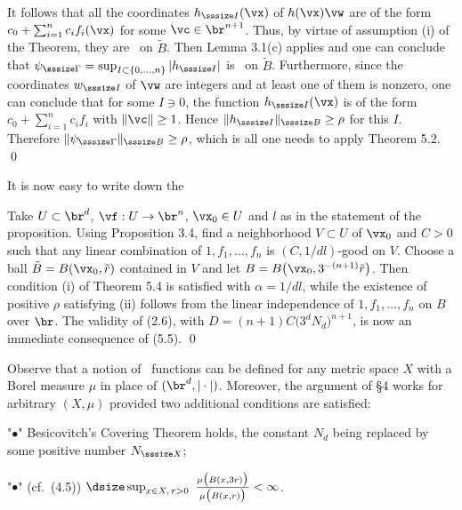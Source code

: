 It follows that all the coordinates $h_{\sssize I}(\vx)$ of $h(\vx)\vw$ are of the form $c_0 + \sum_{i = 1}^nc_if_i(\vx)$ for some $\vc \in \br^{n+1}$. Thus, by virtue of assumption (i) of the Theorem, they are  \cag\ on $\tilde B$. Then Lemma 3.1(c) applies and one can conclude that $\psi_{\sssize \Gamma} = \sup_{I\subset \{0,\dots,n\}}|h_{\sssize I}|$ is \cag\ on $\tilde B$. Furthermore, since the coordinates $w_{\sssize I}$ of $\vw$ are integers and at least one of them is nonzero, one can conclude that for some $I\ni 0$, the function   $h_{\sssize I}(\vx)$ is of the form $c_0 + \sum_{i = 1}^nc_if_i$ with  $\|\vc\| \ge 1$. Hence $\|h_{\sssize I}\|_{\sssize B} \ge \rho$ for this $I$. Therefore $\|\psi_{\sssize \Gamma} \|_{\sssize B} \ge \rho$, which is all one needs to apply Theorem 5.2. 
\qed\enddemo


It is now easy to write down the 


 Take $U\subset \br^d$, $\vf:U\to\br^n$, $\vx_0\in U$ and $l$ as in the statement of the proposition. Using Proposition 3.4, 
find a neighborhood $V\subset U$ of $\vx_0$ and $C> 0$  such that any linear combination of $1,f_1,\dots,f_n$ is $(C,1/dl)$-good on $V$. Choose a ball $\tilde B = B(\vx_0,\tilde r)$ contained in $V$ and let $B = B\big(\vx_0,3^{-(n+1)}\tilde r\big)$. Then  
condition (i) of Theorem 5.4 is satisfied with $\alpha = 1/dl$, while
the existence of positive $\rho$ satisfying (ii) follows from the linear independence of $1,f_1,\dots,f_n$ on $B$ over $\br$. The validity of (2.6), with $D = ({n+1})C\big(3^dN_d\big)^{n+1}$, is now an immediate consequence of (5.5).
\qed\enddemo

\endheading 


\endsubhead 
Observe that a notion of \cag\ functions can be defined for any metric space $X$ with a Borel measure $\mu$ in place of $(\br^d,|\cdot|)$. Moreover, the argument of \S 4 works for arbitrary $(X,\mu)$ provided two additional conditions are satisfied:


\roster 
\item"{$\bullet$}" Besicovitch's Covering Theorem holds, the constant $N_d$ being replaced by some positive number $N_{\sssize X}$;

\item"{$\bullet$}" (cf.~(4.5)) $\dsize\sup_{x\in X,\,r > 0} \ \frac{\mu\big(B(x,3r)\big)}{\mu\big(B(x,r)\big)} < \infty$.

\endroster

